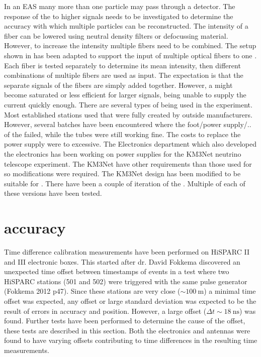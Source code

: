 In an EAS many more than one particle may pass through a detector. The
response of the \pmt to higher signals needs to be investigated to
determine the accuracy with which multiple particles can be
reconstructed. The intensity of a fiber can be lowered using neutral
density filters or defocussing material. However, to increase the
intensity multiple fibers need to be combined. The setup shown in
 has been adapted to support the
input of multiple optical fibers to one \pmt. Each fiber is tested
separately to determine its mean intensity, then different combinations
of multiple fibers are used as input. The expectation is that the
separate signals of the fibers are simply added together. However, a
\pmt might become saturated or less efficient for larger signals, being
unable to supply the current quickly enough. There are several types of
\pmt being used in the \hisparc experiment. Most established stations
used \pmts that were fully created by outside manufacturers. However,
several batches have been encountered where the foot/power supply/.. of
the \pmt failed, while the tubes were still working fine. The costs to
replace the power supply were to excessive. The \nikhef Electronics
department which also developed the \hisparc electronics has been
working on \pmt power supplies for the KM3Net neutrino telescope
experiment. The KM3Net \pmts have other requirements than those used for
\hisparc so modifications were required. The KM3Net design has been
modified to be suitable for \hisparc. There have been a couple of
iteration of the \hisparc \pmts. Multiple \pmts of each of these
versions have been tested.






\section{\gps accuracy}
\label{sec:gps_accuracy}

Time difference calibration measurements have been performed on
HiSPARC II and III electronic boxes. This started after dr. David
Fokkema discovered an unexpected time offset between timestamps of
events in a test where two HiSPARC stations (501 and 502) were triggered
with the same pulse generator (Fokkema 2012 p47). Since these stations
are very close ($\sim\SI{100}{\meter}$) a minimal time offset was
expected, any offset or large standard deviation was expected to be the
result of errors in \gps accuracy and position. However, a large offset
($\Delta t \sim\SI{18}{\nano\second}$) was found. Further tests have
been performed to determine the cause of the offset, these tests are
described in this section. Both the \hisparc electronics and \gps
antennas were found to have varying offsets contributing to time
differences in the resulting time measurements.


